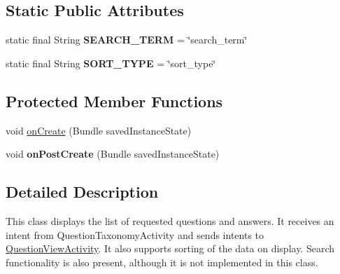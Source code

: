 \subsection*{Static Public Attributes}
\begin{DoxyCompactItemize}
\item 
\hypertarget{classcom_1_1ualberta_1_1team17_1_1view_1_1_question_list_activity_aae0d72f41f03bbb4f2d7891a4f02a0de}{static final String {\bfseries S\+E\+A\+R\+C\+H\+\_\+\+T\+E\+R\+M} = \char`\"{}search\+\_\+term\char`\"{}}\label{classcom_1_1ualberta_1_1team17_1_1view_1_1_question_list_activity_aae0d72f41f03bbb4f2d7891a4f02a0de}

\item 
\hypertarget{classcom_1_1ualberta_1_1team17_1_1view_1_1_question_list_activity_ae67f2ebfe85d429d7558abb81721394c}{static final String {\bfseries S\+O\+R\+T\+\_\+\+T\+Y\+P\+E} = \char`\"{}sort\+\_\+type\char`\"{}}\label{classcom_1_1ualberta_1_1team17_1_1view_1_1_question_list_activity_ae67f2ebfe85d429d7558abb81721394c}

\end{DoxyCompactItemize}
\subsection*{Protected Member Functions}
\begin{DoxyCompactItemize}
\item 
void \hyperlink{classcom_1_1ualberta_1_1team17_1_1view_1_1_question_list_activity_aa8f4f9e5120f231fceb3cab22a99bc6d}{on\+Create} (Bundle saved\+Instance\+State)
\item 
\hypertarget{classcom_1_1ualberta_1_1team17_1_1view_1_1_question_list_activity_aaa9990a39b72c47e3034b20a238ae8e8}{void {\bfseries on\+Post\+Create} (Bundle saved\+Instance\+State)}\label{classcom_1_1ualberta_1_1team17_1_1view_1_1_question_list_activity_aaa9990a39b72c47e3034b20a238ae8e8}

\end{DoxyCompactItemize}


\subsection{Detailed Description}
This class displays the list of requested questions and answers. It receives an intent from Question\+Taxonomy\+Activity and sends intents to \hyperlink{classcom_1_1ualberta_1_1team17_1_1view_1_1_question_view_activity}{Question\+View\+Activity}. It also supports sorting of the data on display. Search functionality is also present, although it is not implemented in this class.

